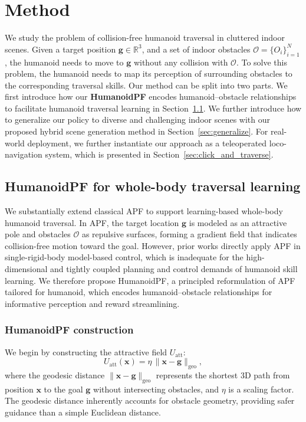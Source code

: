 \section{Method}
\label{sec:method}


We study the problem of collision-free humanoid traversal in cluttered indoor scenes. Given a target position $\mathbf{g} \in \mathbb{R}^3$, and a set of indoor obstacles $\mathcal{O} = \{ O_i \}_{i=1}^{N}$, the humanoid needs to move to $\mathbf{g}$ without any collision with $\mathcal{O}$. To solve this problem, the humanoid needs to map its perception of surrounding obstacles to the corresponding traversal skills. Our method can be split into two parts. We first introduce how our \textbf{HumanoidPF} encodes humanoid–obstacle relationships to facilitate humanoid traversal learning in Section~\ref{sec:apf_humanoid}. We further introduce how to generalize our policy to diverse and challenging indoor scenes with our proposed hybrid scene generation method in Section~\ref{sec:generalize}. 
For real-world deployment, we further instantiate our approach as a teleoperated loco-navigation system, which is presented in Section~\ref{sec:click_and_traverse}.

\subsection{HumanoidPF for whole-body traversal learning}
\label{sec:apf_humanoid}
We substantially extend classical APF to support learning-based whole-body humanoid traversal. In APF, the target location $\mathbf{g}$ is modeled as an attractive pole and obstacles $\mathcal{O}$ as repulsive surfaces, forming a gradient field that indicates collision-free motion toward the goal. However, prior works directly apply APF in single-rigid-body model-based control, which is inadequate for the high-dimensional and tightly coupled planning and control demands of humanoid skill learning. We therefore propose HumanoidPF, a principled reformulation of APF tailored for humanoid, which encodes humanoid–obstacle relationships for informative perception and reward streamlining.

\subsubsection{HumanoidPF construction}
\label{sec:humanoidpf_construction}
We begin by constructing the attractive field $U_{\text{att}}$:
\begin{equation}
U_{\text{att}}(\mathbf{x}) = \eta \, \| \mathbf{x} - \mathbf{g} \|_{\text{geo}},
\end{equation}
where the geodesic distance $\| \mathbf{x} - \mathbf{g} \|_{\text{geo}}$ represents the shortest 3D path from position $\mathbf{x}$ to the goal $\mathbf{g}$ without intersecting obstacles, and $\eta$ is a scaling factor. The geodesic distance inherently accounts for obstacle geometry, providing safer guidance than a simple Euclidean distance.

